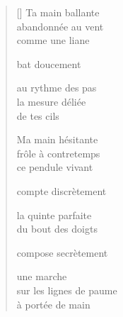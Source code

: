 \documentclass[11pt,a4paper]{article}
\begin{document}
\thispagestyle{empty}


\settowidth{\versewidth}{sur les lignes de paume}

\bigskip

\begin{verse}[\versewidth]
  Ta main ballante \\
  abandonnée au vent \\
  comme une liane

  bat doucement

  au rythme des pas \\
  la mesure déliée \\
  de tes cils

  Ma main hésitante \\
  frôle à contretemps \\
  ce pendule vivant

  compte discrètement

  la quinte parfaite \\
  du bout des doigts

  compose secrètement

  une marche \\
  sur les lignes de paume \\
  à portée de main
\end{verse}
\end{document}
